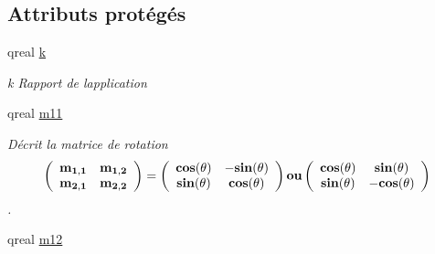 \subsection*{Attributs protégés}
\begin{DoxyCompactItemize}
\item 
\hypertarget{class_application_aa28f2399db4f7c3a48c98d59e62733ea}{}qreal \hyperlink{class_application_aa28f2399db4f7c3a48c98d59e62733ea}{k}\label{class_application_aa28f2399db4f7c3a48c98d59e62733ea}

\begin{DoxyCompactList}\small\item\em k Rapport de l\textquotesingle{}application \end{DoxyCompactList}\item 
\hypertarget{class_application_ae4f71662bf31fcbd52aac06c1741bead}{}qreal \hyperlink{class_application_ae4f71662bf31fcbd52aac06c1741bead}{m11}\label{class_application_ae4f71662bf31fcbd52aac06c1741bead}

\begin{DoxyCompactList}\small\item\em Décrit la matrice de rotation \[ \bf \left( \begin{array}{ccc} \bf m_{1,1} & \bf m_{1,2} \\ \bf m_{2,1} & \bf m_{2,2} \\ \end{array} \bf\right) \bf= \bf\left( \begin{array}{ccc} \bf cos(\bf\theta) & \bf -sin(\bf\theta) \\ \bf sin(\bf\theta) & \bf cos(\bf\theta) \\ \end{array} \bf\right) \bf ou \bf\left( \begin{array}{ccc} \bf cos(\bf\theta) & \bf sin(\bf\theta) \\ \bf sin(\bf\theta) & \bf -cos(\bf\theta) \\ \end{array} \bf\right) \]. \end{DoxyCompactList}\item 
\hypertarget{class_application_a6c1095602143845a433dc1c2232479c8}{}qreal \hyperlink{class_application_a6c1095602143845a433dc1c2232479c8}{m12}\label{class_application_a6c1095602143845a433dc1c2232479c8}


\end{DoxyCompactItemize}
